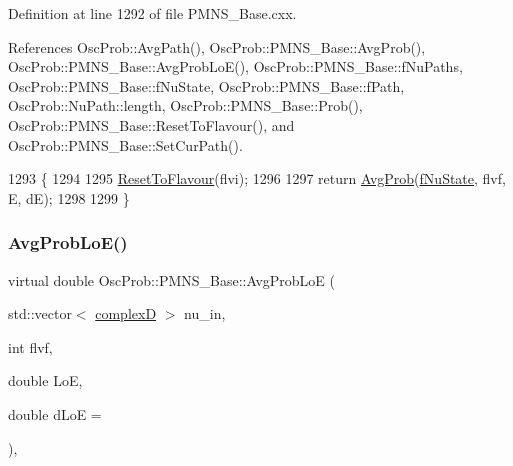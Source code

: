 Definition at line 1292 of file P\+M\+N\+S\+\_\+\+Base.\+cxx.



References Osc\+Prob\+::\+Avg\+Path(), Osc\+Prob\+::\+P\+M\+N\+S\+\_\+\+Base\+::\+Avg\+Prob(), Osc\+Prob\+::\+P\+M\+N\+S\+\_\+\+Base\+::\+Avg\+Prob\+Lo\+E(), Osc\+Prob\+::\+P\+M\+N\+S\+\_\+\+Base\+::f\+Nu\+Paths, Osc\+Prob\+::\+P\+M\+N\+S\+\_\+\+Base\+::f\+Nu\+State, Osc\+Prob\+::\+P\+M\+N\+S\+\_\+\+Base\+::f\+Path, Osc\+Prob\+::\+Nu\+Path\+::length, Osc\+Prob\+::\+P\+M\+N\+S\+\_\+\+Base\+::\+Prob(), Osc\+Prob\+::\+P\+M\+N\+S\+\_\+\+Base\+::\+Reset\+To\+Flavour(), and Osc\+Prob\+::\+P\+M\+N\+S\+\_\+\+Base\+::\+Set\+Cur\+Path().


\begin{DoxyCode}
1293 \{
1294 
1295   \hyperlink{classOscProb_1_1PMNS__Base_ac0d4bf8ff1318ef96d3dafa62e0cec25}{ResetToFlavour}(flvi);
1296 
1297   \textcolor{keywordflow}{return} \hyperlink{classOscProb_1_1PMNS__Base_a32ccdf67b4f31da952a7e254f8629509}{AvgProb}(\hyperlink{classOscProb_1_1PMNS__Base_abf99f2339e3ee989600740b5d88063e8}{fNuState}, flvf, E, dE);
1298 
1299 \}
\end{DoxyCode}
\mbox{\label{classOscProb_1_1PMNS__Base_a30d0b056f592acba53cf9ed07430800c}} 
\subsubsection{\texorpdfstring{Avg\+Prob\+Lo\+E()}{AvgProbLoE()}\hspace{0.1cm}{\footnotesize\ttfamily [1/2]}}
{\footnotesize\ttfamily virtual double Osc\+Prob\+::\+P\+M\+N\+S\+\_\+\+Base\+::\+Avg\+Prob\+LoE (\begin{DoxyParamCaption}\item[{std\+::vector$<$ \hyperlink{EigenPoint_8h_a67ca8e107e20610c3fff78d5e726ece0}{complexD} $>$}]{nu\+\_\+in,  }\item[{int}]{flvf,  }\item[{double}]{LoE,  }\item[{double}]{d\+LoE = {} }\end{DoxyParamCaption})\hspace{0.3cm}{\ttfamily [virtual]}, {\ttfamily [inherited]}}



